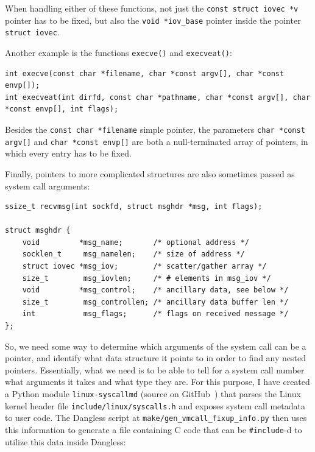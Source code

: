 When handling either of these functions, not just the \lstinline!const struct iovec *v! pointer has to be fixed, but also the \lstinline!void *iov_base! pointer inside the pointer \lstinline!struct iovec!.

Another example is the functions \lstinline!execve()! and \lstinline!execveat()!:

\begin{lstlisting}
int execve(const char *filename, char *const argv[], char *const envp[]);
int execveat(int dirfd, const char *pathname, char *const argv[], char *const envp[], int flags);
\end{lstlisting}

Besides the \lstinline!const char *filename! simple pointer, the parameters \lstinline!char *const argv[]! and \lstinline!char *const envp[]! are both a null-terminated array of pointers, in which every entry has to be fixed.

Finally, pointers to more complicated structures are also sometimes passed as system call arguments:

\begin{lstlisting}
ssize_t recvmsg(int sockfd, struct msghdr *msg, int flags);

struct msghdr {
	void         *msg_name;       /* optional address */
	socklen_t     msg_namelen;    /* size of address */
	struct iovec *msg_iov;        /* scatter/gather array */
	size_t        msg_iovlen;     /* # elements in msg_iov */
	void         *msg_control;    /* ancillary data, see below */
	size_t        msg_controllen; /* ancillary data buffer len */
	int           msg_flags;      /* flags on received message */
};
\end{lstlisting}

So, we need some way to determine which arguments of the system call can be a pointer, and identify what data structure it points to in order to find any nested pointers. Essentially, what we need is to be able to tell for a system call number what arguments it takes and what type they are. For this purpose, I have created a Python module \texttt{linux-syscallmd} (source on GitHub~\cite{github-linux-syscallmd}) that parses the Linux kernel header file \texttt{include/linux/syscalls.h} and exposes system call metadata to user code. The Dangless script at \texttt{make/gen\_vmcall\_fixup\_info.py} then uses this information to generate a file containing C code that can be \lstinline!#include!-d to utilize this data inside Dangless:

